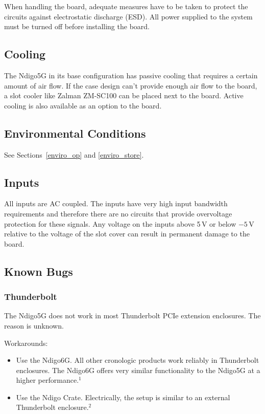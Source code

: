     When handling the board, adequate measures have to be taken to protect the circuits against electrostatic discharge (ESD). All power supplied to the system must be turned off before installing the board.

\subsection{Cooling}

    The Ndigo5G in its base configuration has passive cooling that requires a certain amount of air flow. If the case design can't provide enough air flow to the board, a slot cooler like Zalman ZM-SC100 can be placed next to the board. Active cooling is also available as an option to the board.

\subsection{Environmental Conditions}
    See Sections~\ref{enviro_op} and \ref{enviro_store}.

\subsection{Inputs}

    All inputs are AC coupled. The inputs have very high input bandwidth requirements and therefore there are no circuits that provide overvoltage protection for these signals. Any voltage on the inputs above 5\,V or below $-5$\,V relative to the voltage of the slot cover can result in permanent damage to the board.

\subsection{Known Bugs}

\subsubsection{Thunderbolt}
The Ndigo5G does not work in most Thunderbolt PCIe extension enclosures. The reason is unknown.\par
Workarounds:
\begin{itemize}
    \item Use the Ndigo6G. All other cronologic products work reliably in Thunderbolt enclosures. The Ndigo6G offers very similar functionality to the Ndigo5G at a higher performance.$^1$
    \item Use the Ndigo Crate. Electrically, the setup is similar to an external Thunderbolt enclosure.$^2$ 
\end{itemize}

